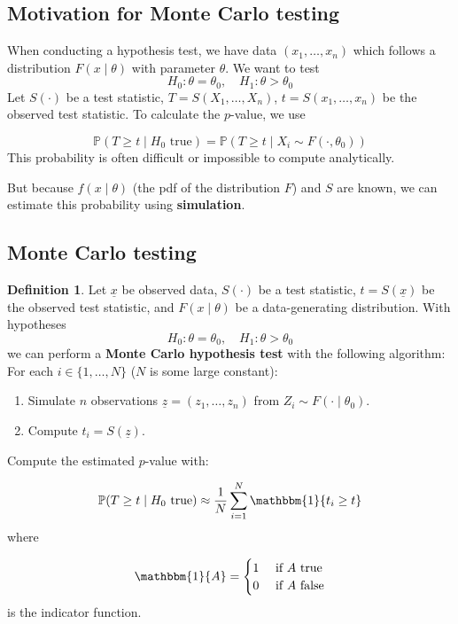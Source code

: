 \documentclass[12pt,a4paper]{article}
\theoremstyle{definition}
\newtheorem{definition}{Definition}[subsection]
\begin{document}
\subsection{Motivation for Monte Carlo testing}

When conducting a hypothesis test, we have data $(x_1, \dots, x_n)$ which follows a distribution $F(x \mid \theta)$ with parameter $\theta$. We want to test
\[
	H_0: \theta = \theta_0, \quad H_1: \theta > \theta_0 
\]
Let $S(\cdot)$ be a test statistic, $T = S(X_1, \dots, X_n)$, $t = S(x_1, \dots, x_n)$ be the observed test statistic. To calculate the $p$-value, we use

\[ \mathbb{P}(T \ge t \mid H_0 \text{ true}) = \mathbb{P}(T \ge t \mid X_i \sim F(\cdot, \theta_0)) \]
This probability is often difficult or impossible to compute analytically.

But because $f(x \mid \theta)$ (the pdf of the distribution $F$) and $S$ are known, we can estimate this probability using \textbf{simulation}.

\subsection{Monte Carlo testing}

\begin{definition}
	Let $\underline{x}$ be observed data, $S(\cdot)$ be a test statistic, $t = S(\underline{x})$ be the observed test statistic, and $F(x \mid \theta)$ be a data-generating distribution. With hypotheses
	\[
		H_0: \theta = \theta_0, \quad H_1: \theta > \theta_0
	\]
	we can perform a \textbf{Monte Carlo hypothesis test} with the following algorithm:\\

	For each $i \in \{1, \dots, N\}$ ($N$ is some large constant):
	\begin{enumerate}
		\item Simulate $n$ observations $\underline{z} = (z_1, \dots, z_n)$ from $Z_i \sim F(\cdot \mid \theta_0)$.
		\item Compute $t_i = S(\underline{z})$.
	\end{enumerate}
	Compute the estimated $p$-value with:

	\[ \mathbb{P}(T \ge t \mid H_0 \text{ true}) \approx \frac{1}{N} \sum_{i = 1}^N \mathbbm{1}\{ t_i \ge t \} \]
	where
	
	\[ \mathbbm{1} \{ A \} = \begin{cases}
		1 & \text{ if } A \text{ true}\\
		0 & \text{ if } A \text{ false}
	\end{cases} \]
	is the indicator function.
\end{definition}
\end{document}
